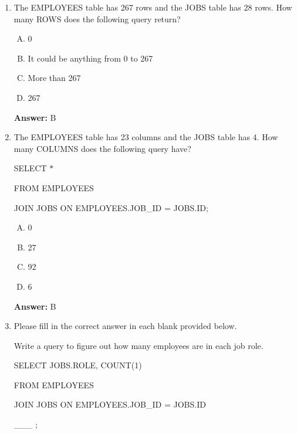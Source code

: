 \documentclass[12pt]{article}
\begin{document}
\begin{enumerate}[1.]
    \item

    The EMPLOYEES table has 267 rows and the JOBS table has 28 rows. How many ROWS
    does the following query return?

    \bigskip

    \begin{enumerate}[A.]
        \item 0
        \item It could be anything from 0 to 267
        \item More than 267
        \item 267
    \end{enumerate}

    \bigskip

    \textbf{Answer:} B

    \item

    The EMPLOYEES table has 23 columns and the JOBS table has 4. How many COLUMNS
    does the following query have?

    \bigskip

    SELECT $\ast$

    FROM EMPLOYEES

    JOIN JOBS ON EMPLOYEES.JOB\_ID = JOBS.ID;

    \begin{enumerate}[A.]
        \item 0
        \item 27
        \item 92
        \item 6
    \end{enumerate}

    \bigskip

    \textbf{Answer:} B

    \item

    Please fill in the correct answer in each blank provided below.

    \bigskip

    Write a query to figure out how many employees are in each job role.

    \bigskip

    SELECT JOBS.ROLE, COUNT(1)

    FROM EMPLOYEES

    JOIN JOBS ON EMPLOYEES.JOB\_ID = JOBS.ID

    \_\_\_ ;


\end{enumerate}
\end{document}
